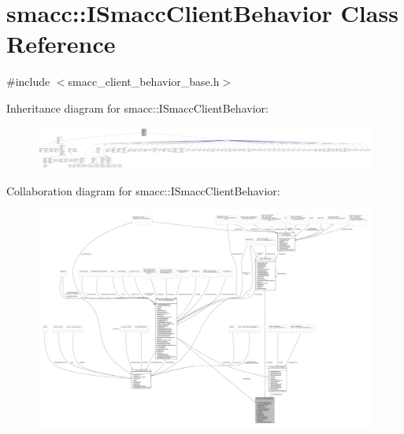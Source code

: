 \hypertarget{classsmacc_1_1ISmaccClientBehavior}{}\section{smacc\+:\+:I\+Smacc\+Client\+Behavior Class Reference}
\label{classsmacc_1_1ISmaccClientBehavior}


{\ttfamily \#include $<$smacc\+\_\+client\+\_\+behavior\+\_\+base.\+h$>$}



Inheritance diagram for smacc\+:\+:I\+Smacc\+Client\+Behavior\+:
\nopagebreak
\begin{figure}[H]
\begin{center}
\leavevmode
\includegraphics[width=350pt]{classsmacc_1_1ISmaccClientBehavior__inherit__graph}
\end{center}
\end{figure}


Collaboration diagram for smacc\+:\+:I\+Smacc\+Client\+Behavior\+:
\nopagebreak
\begin{figure}[H]
\begin{center}
\leavevmode
\includegraphics[width=350pt]{classsmacc_1_1ISmaccClientBehavior__coll__graph}
\end{center}
\end{figure}
